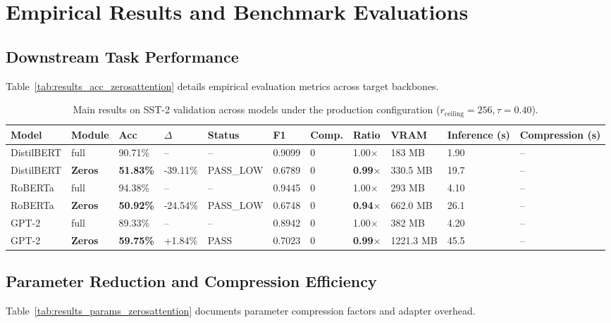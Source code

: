 \section{Empirical Results and Benchmark Evaluations}

\subsection{Downstream Task Performance}
Table~\ref{tab:results_acc_zerosattention} details empirical evaluation metrics across target backbones.

\begin{table}[t]
\centering
\small
\begin{tabular}{lllllllllll}
\toprule
\textbf{Model} & \textbf{Module} & \textbf{Acc} & \textbf{$\Delta$} & \textbf{Status} & \textbf{F1} & \textbf{Comp.} & \textbf{Ratio} & \textbf{VRAM} & \textbf{Inference (s)} & \textbf{Compression (s)} \\
\midrule
DistilBERT & full & 90.71\% & -- & -- & 0.9099 & 0 & 1.00$\times$ & 183 MB & 1.90 & -- \\
DistilBERT & \textbf{Zeros} & \textbf{51.83\%} & -39.11\% & PASS_LOW & 0.6789 & 0 & \textbf{0.99$\times$} & 330.5 MB & 19.7 & -- \\
RoBERTa & full & 94.38\% & -- & -- & 0.9445 & 0 & 1.00$\times$ & 293 MB & 4.10 & -- \\
RoBERTa & \textbf{Zeros} & \textbf{50.92\%} & -24.54\% & PASS_LOW & 0.6748 & 0 & \textbf{0.94$\times$} & 662.0 MB & 26.1 & -- \\
GPT-2 & full & 89.33\% & -- & -- & 0.8942 & 0 & 1.00$\times$ & 382 MB & 4.20 & -- \\
GPT-2 & \textbf{Zeros} & \textbf{59.75\%} & +1.84\% & PASS & 0.7023 & 0 & \textbf{0.99$\times$} & 1221.3 MB & 45.5 & -- \\
\bottomrule
\end{tabular}
\caption{Main results on SST-2 validation across models under the production configuration ($r_{\mathrm{ceiling}}=256, \tau=0.40$).}
\label{tab:main_sst2}
\end{table}

\subsection{Parameter Reduction and Compression Efficiency}
Table~\ref{tab:results_params_zerosattention} documents parameter compression factors and adapter overhead.

